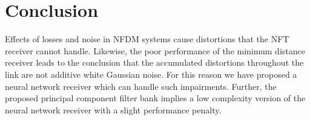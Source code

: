 \section{Conclusion}
Effects of losses and noise in NFDM systems cause distortions that the NFT receiver cannot handle. Likewise, the poor performance of the minimum distance receiver leads to the conclusion that the accumulated distortions throughout the link are not additive white Gaussian noise. For this reason we have proposed a neural network receiver which can handle such impairments. Further, the proposed principal component filter bank implies a low complexity version of the neural network receiver with a slight performance penalty.
